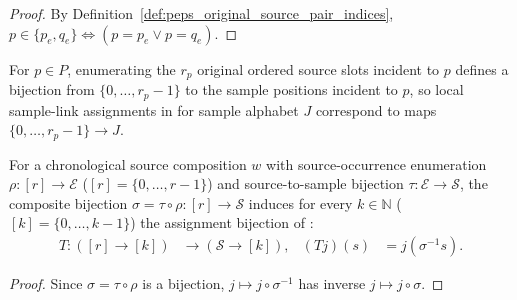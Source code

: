 \begin{proof}\leanok
    By Definition~\ref{def:peps_original_source_pair_indices},
    $p\in\{p_e,q_e\}\iff (p=p_e\lor p=q_e)$.
\end{proof}

\begin{definition}
    \label{def:peps_local_source_sample_indices}
    \leanok
    For $p\in P$, enumerating the $r_p$ original ordered source slots incident
    to $p$ defines a bijection from $\{0,\ldots,r_p-1\}$ to the sample
    positions incident to $p$, so local sample-link assignments in
    \cite[proof of Theorem~5.2]{OpenAI2026PolynomialPEPS} for sample alphabet
    $J$ correspond to maps $\{0,\ldots,r_p-1\}\to J$.
\end{definition}


\begin{definition}
    \label{def:peps_source_sample_assignment_indices}
    \leanok
    For a chronological source composition $w$ with source-occurrence enumeration
    $\rho:[r]\to\mathcal E$ ($[r]=\{0,\ldots,r-1\}$) and source-to-sample
    bijection $\tau:\mathcal E\to\mathcal S$, the composite bijection
    $\sigma=\tau\circ\rho:[r]\to\mathcal S$ induces for every $k\in\mathbb N$
    ($[k]=\{0,\ldots,k-1\}$) the assignment bijection of
    \cite[proof of Theorem~5.2]{OpenAI2026PolynomialPEPS}:
    \begin{align}
        T:([r]\to[k]) & \longrightarrow(\mathcal S\to[k]), &
        (Tj)(s)       & =j(\sigma^{-1}s).
        \label{eq:peps_source_sample_assignment_bijection}
    \end{align}
\end{definition}

\begin{proof}\leanok
    Since $\sigma=\tau\circ\rho$ is a bijection, $j\mapsto j\circ\sigma^{-1}$
    has inverse $j\mapsto j\circ\sigma$.
\end{proof}

